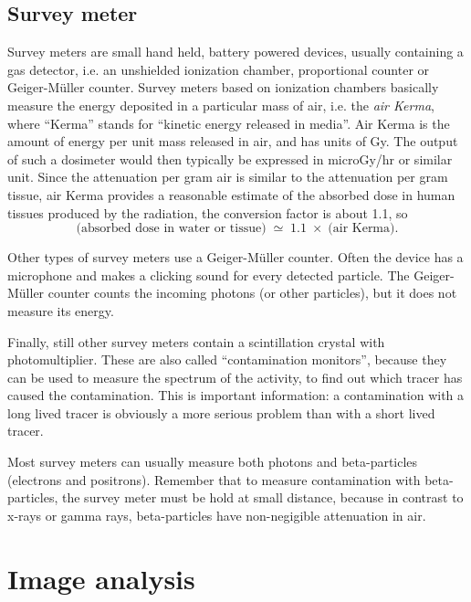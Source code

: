 \documentclass[11pt,oneside]{book}
\begin{document}
\section{Survey meter}
Survey meters are small hand held, battery powered devices, usually
containing a gas detector, i.e. an unshielded ionization chamber,
proportional counter or Geiger-M\"uller counter. Survey meters based
on ionization chambers basically measure the energy deposited in a
particular mass of air, i.e. the {\em air Kerma}, where ``Kerma''
stands for ``kinetic energy released in media''. Air Kerma is the
amount of energy per unit mass released in air, and has units of
Gy. The output of such a dosimeter would then typically be expressed
in microGy/hr or similar unit. Since the attenuation per gram air is
similar to the attenuation per gram tissue, air Kerma provides a
reasonable estimate of the absorbed dose in human tissues produced by
the radiation, the conversion factor is about 1.1, so
\begin{equation}
  \mbox{(absorbed dose in water or tissue)} \; \simeq \; 1.1 \; \times \;
    \mbox{(air Kerma)}.
\end{equation}

Other types of survey meters use a Geiger-M\"uller counter.
Often the device has a microphone and makes a
clicking sound for every detected particle. The Geiger-M\"uller
counter counts the incoming photons (or other particles), but it does
not measure its energy.

Finally, still other survey meters contain a scintillation crystal
with photomultiplier. These are also called ``contamination
monitors'', because they can be used to measure the spectrum of the
activity, to find out which tracer has caused the contamination.  This
is important information: a contamination with a long lived tracer is
obviously a more serious problem than with a short lived tracer.

Most survey meters can usually measure both photons and beta-particles
(electrons and positrons). Remember that to measure contamination with
beta-particles, the survey meter must be hold at small distance, because
in contrast to x-rays or gamma rays,
beta-particles have non-negigible attenuation in air.

\chapter{Image analysis}

\end{document}
